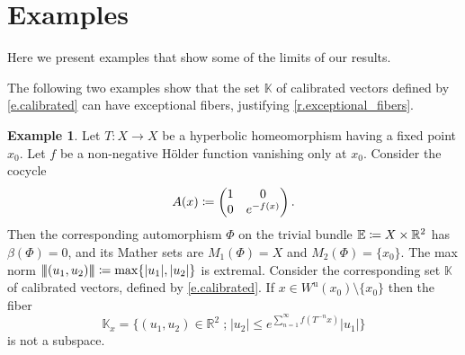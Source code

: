 \documentclass[JEP,XML,SOM,Unicode]{cedram}
\def\vcentcolon{\mathrel{\mathop\ordinarycolon}}
\providecommand\ordinarycolon{:}
\providecommand*\coloneqq{\vcentcolon\mathrel{\mkern-1.2mu}=}
\theoremstyle{plain}
\theoremstyle{definition}
\newtheorem{example}[theorem]{Example}
\newcommand{\tribar}[1]{\mathopen{| {\kern -1.5pt} | {\kern -1.5pt} |} {#1}
\mathclose{| {\kern -1.5pt} | {\kern -1.5pt} |}}
\newcommand{\RR}{\mathbb{R}}
\newcommand{\EE}{\mathbb{E}}
\newcommand{\KK}{\mathbb{K}}
\newcommand{\st}{\;\mathord{;}\;}
\newcommand{\uu}{\mathrm{u}}
\begin{document}
\section{Examples}\label{s.examples}

Here we present examples that show some of the limits of our results.

\label{ss.examples_calibrated}

The following two examples show that the set $\KK$ of calibrated vectors defined by \eqref{e.calibrated} can have exceptional fibers, justifying \cref{r.exceptional_fibers}.

\begin{example}\label{ex.non_space}
Let $T \colon X \to X$ be a hyperbolic homeomorphism having a fixed point $x_0$.
Let $f$ be a non-negative Hölder function vanishing only at $x_0$.
Consider the cocycle
\[
A(x) \coloneqq \begin{pmatrix} 1 & 0 \\ 0 & e^{-f(x)} \end{pmatrix}.
\]
Then the corresponding automorphism $\Phi$ on the trivial bundle $\EE \coloneqq X \times \RR^2$ has $\beta(\Phi) = 0$, and its Mather sets are $M_1(\Phi) = X$ and $M_2(\Phi) = \{x_0\}$.
The max norm $\tribar{(u_1,u_2)} \coloneqq \max \{|u_1|,|u_2|\}$ is extremal.
Consider the corresponding set $\KK$ of calibrated vectors, defined by \eqref{e.calibrated}.
If $x \in W^\uu(x_0) \setminus \{x_0\}$ then the fiber
\[
\KK_x = \big\{ (u_1,u_2) \in \RR^2 \st |u_2| \le e^{\sum_{n=1}^\infty f(T^{-n} x)} |u_1| \big\}
\]
is not a subspace.
\end{example}
\end{document}
